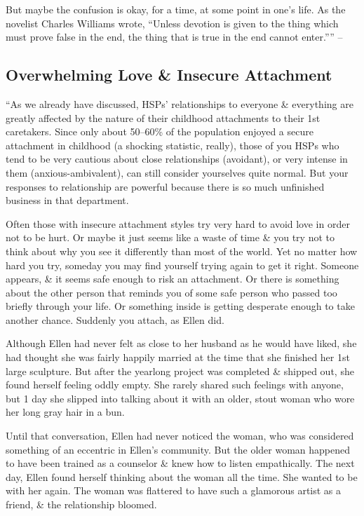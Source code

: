 \documentclass{article}
\numberwithin{equation}{section}
\begin{document}
But maybe the confusion is okay, for a time, at some point in one's life. As the novelist Charles Williams wrote, ``Unless devotion is given to the thing which must prove false in the end, the thing that is true in the end cannot enter.'''' -- \cite[pp. 173--174]{Aron2013}

\subsection{Overwhelming Love \& Insecure Attachment}
``As we already have discussed, HSPs' relationships to everyone \& everything are greatly affected by the nature of their childhood attachments to their 1st caretakers. Since only about 50--60\% of the population enjoyed a secure attachment in childhood (a shocking statistic, really), those of you HSPs who tend to be very cautious about close relationships (avoidant), or very intense in them (anxious-ambivalent), can still consider yourselves quite normal. But your responses to relationship are powerful because there is so much unfinished business in that department.

Often those with insecure attachment styles try very hard to avoid love in order not to be hurt. Or maybe it just seems like a waste of time \& you try not to think about why you see it differently than most of the world. Yet no matter how hard you try, someday you may find yourself trying again to get it right. Someone appears, \& it seems safe enough to risk an attachment. Or there is something about the other person that reminds you of some safe person who passed too briefly through your life. Or something inside is getting desperate enough to take another chance. Suddenly you attach, as Ellen did.

Although Ellen had never felt as close to her husband as he would have liked, she had thought she was fairly happily married at the time that she finished her 1st large sculpture. But after the yearlong project was completed \& shipped out, she found herself feeling oddly empty. She rarely shared such feelings with anyone, but 1 day she slipped into talking about it with an older, stout woman who wore her long gray hair in a bun.

Until that conversation, Ellen had never noticed the woman, who was considered something of an eccentric in Ellen's community. But the older woman happened to have been trained as a counselor \& knew how to listen empathically. The next day, Ellen found herself thinking about the woman all the time. She wanted to be with her again. The woman was flattered to have such a glamorous artist as a friend, \& the relationship bloomed.
\end{document}
